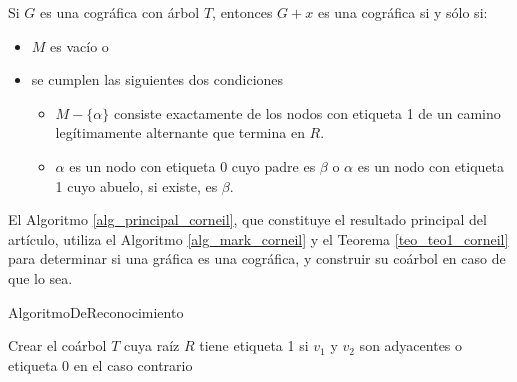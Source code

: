 \begin{theorem}
    \label{teo_teo1_corneil}
    Si $G$ es una cográfica con árbol $T$, entonces $G+x$ es una cográfica si y sólo si:
    \begin{itemize}
        \item $M$ es vacío o
        \item se cumplen las siguientes dos condiciones
        \begin{itemize}
            \item $M-\{\alpha\}$ consiste exactamente de los nodos
              con etiqueta 1 de un camino legítimamente alternante
              que termina en $R$.

            \item $\alpha$ es un nodo con etiqueta 0 cuyo padre es
              $\beta$ o $\alpha$ es un nodo con etiqueta 1 cuyo
              abuelo, si existe, es $\beta$.
        \end{itemize}
    \end{itemize}
\end{theorem}

El Algoritmo \ref{alg_principal_corneil}, que constituye el resultado
principal del artículo, utiliza el Algoritmo \ref{alg_mark_corneil} y
el Teorema \ref{teo_teo1_corneil} para determinar si una gráfica es
una cográfica, y construir su coárbol en caso de que lo sea.

\begin{algorithm}[!htbp]
\caption{AlgoritmoDeReconocimiento}
\label{alg_principal_corneil}
\DontPrintSemicolon %

Crear el coárbol $T$ cuya raíz $R$ tiene etiqueta 1 si $v_1$ y $v_2$ son adyacentes o etiqueta 0 en el caso contrario\;


\end{algorithm}

